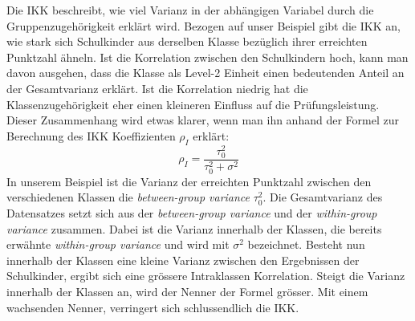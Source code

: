 \documentclass[12pt]{article}\usepackage[]{graphicx}\usepackage[]{color}
\begin{document}
Die IKK beschreibt, wie viel Varianz in der abhängigen Variabel durch die Gruppenzugehörigkeit erklärt wird. Bezogen auf unser Beispiel gibt die IKK an, wie stark sich Schulkinder aus derselben Klasse bezüglich ihrer erreichten Punktzahl ähneln. Ist die Korrelation zwischen den Schulkindern hoch, kann man davon ausgehen, dass die Klasse als Level-2 Einheit einen bedeutenden Anteil an der Gesamtvarianz erklärt. Ist die Korrelation niedrig hat die Klassenzugehörigkeit eher einen kleineren Einfluss auf die Prüfungsleistung. Dieser Zusammenhang wird etwas klarer, wenn man ihn anhand der Formel zur Berechnung des IKK Koeffizienten $\rho_{I}$ erklärt:
\begin{equation} \label{eq:icc}
\rho_{I} = \dfrac{\tau_{0}^{2}}{\tau_{0}^{2} + \sigma^{2}}
\end{equation} 
In unserem Beispiel ist die Varianz der erreichten Punktzahl zwischen den verschiedenen Klassen die \textit{between-group variance} $\tau_{0}^2$. Die Gesamtvarianz des Datensatzes setzt sich aus der \textit{between-group variance} und der \textit{within-group variance} zusammen. Dabei ist die Varianz innerhalb der Klassen, die bereits erwähnte \textit{within-group variance} und wird mit $\sigma^2$ bezeichnet. Besteht nun innerhalb der Klassen eine kleine Varianz zwischen den Ergebnissen der Schulkinder, ergibt sich eine grössere Intraklassen Korrelation. Steigt die Varianz innerhalb der Klassen an, wird der Nenner der Formel grösser. Mit einem wachsenden Nenner, verringert sich schlussendlich die IKK.
\end{document}
